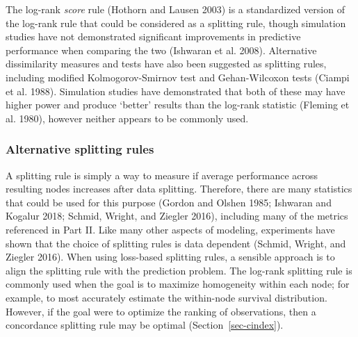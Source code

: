 \documentclass[
  letterpaper,
  krantz2]{style/krantz}
\begin{document}
The log-rank \emph{score} rule (Hothorn and Lausen 2003) is a
standardized version of the log-rank rule that could be considered as a
splitting rule, though simulation studies have not demonstrated
significant improvements in predictive performance when comparing the
two (Ishwaran et al.
2008).
Alternative dissimilarity measures and tests have also been suggested as
splitting rules, including modified Kolmogorov-Smirnov test and
Gehan-Wilcoxon tests (Ciampi et al.
1988).
Simulation studies have demonstrated that both of these may have higher
power and produce `better' results than the log-rank statistic (Fleming
et al. 1980), however neither appears to be commonly used.

\subsubsection{Alternative splitting
rules}\label{alternative-splitting-rules}

A splitting rule is simply a way to measure if average performance
across resulting nodes increases after data splitting. Therefore, there
are many statistics that could be used for this purpose (Gordon and
Olshen 1985; Ishwaran and Kogalur 2018; Schmid, Wright, and Ziegler
2016), including many of the metrics referenced in Part II. Like many
other aspects of modeling, experiments have shown that the choice of
splitting rules is data dependent (Schmid, Wright, and Ziegler 2016).
When using loss-based splitting rules, a sensible approach is to align
the splitting rule with the prediction problem. The log-rank splitting
rule is commonly used when the goal is to maximize homogeneity within
each node; for example, to most accurately estimate the within-node
survival distribution. However, if the goal were to optimize the ranking
of observations, then a concordance splitting rule may be optimal
(Section~\ref{sec-cindex}).
\end{document}
